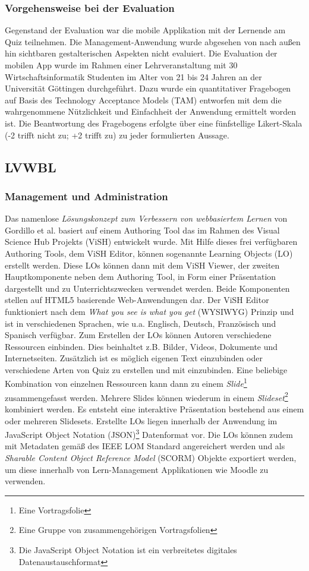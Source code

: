 \documentclass[conference]{IEEEtran}
\begin{document}
\subsubsection{Vorgehensweise bei der Evaluation}
Gegenstand der Evaluation war die mobile Applikation mit der Lernende am Quiz teilnehmen. Die Management-Anwendung wurde abgesehen von nach außen hin sichtbaren gestalterischen Aspekten nicht evaluiert. Die Evaluation der mobilen App wurde im Rahmen einer Lehrveranstaltung mit 30 Wirtschaftsinformatik Studenten im Alter von 21 bis 24 Jahren an der Universität Göttingen durchgeführt. Dazu wurde ein quantitativer Fragebogen auf Basis des Technology Acceptance Models (TAM) \cite[S. 985]{Davis1989} entworfen mit dem die wahrgenommene Nützlichkeit und Einfachheit der Anwendung ermittelt worden ist. Die Beantwortung des Fragebogens erfolgte über eine fünfstellige Likert-Skala (-2 trifft nicht zu; +2 trifft zu) zu jeder formulierten Aussage.\cite[S. 342]{Hobert2017}

\subsection{LVWBL}
\subsubsection{Management und Administration}
Das namenlose \emph{Lösungskonzept zum Verbessern von webbasiertem Lernen} von Gordillo et al. basiert auf einem Authoring Tool das im Rahmen des Visual Science Hub Projekts (ViSH) \cite{Barra2014} entwickelt wurde. Mit Hilfe dieses frei verfügbaren Authoring Tools, dem ViSH Editor, können sogenannte Learning Objects (LO) erstellt werden. Diese LOs können dann mit dem ViSH Viewer, der zweiten Hauptkomponente neben dem Authoring Tool, in Form einer Präsentation dargestellt und zu Unterrichtszwecken verwendet werden. Beide Komponenten stellen auf HTML5 basierende Web-Anwendungen dar. Der ViSH Editor funktioniert nach dem \emph{What you see is what you get} (WYSIWYG) Prinzip und ist in verschiedenen Sprachen, wie u.a. Englisch, Deutsch, Französisch und Spanisch verfügbar. Zum Erstellen der LOs können Autoren verschiedene Ressourcen einbinden. Dies beinhaltet z.B. Bilder, Videos, Dokumente und Internetseiten. Zusätzlich ist es möglich eigenen Text einzubinden oder verschiedene Arten von Quiz zu erstellen und mit einzubinden. Eine beliebige Kombination von einzelnen Ressourcen kann dann zu einem \emph{Slide}\footnote{Eine Vortragsfolie} zusammengefasst werden. Mehrere Slides können wiederum in einem \emph{Slideset}\footnote{Eine Gruppe von zusammengehörigen Vortragsfolien} kombiniert werden. Es entsteht eine interaktive Präsentation bestehend aus einem oder mehreren Slidesets. Erstellte LOs liegen innerhalb der Anwendung im JavaScript Object Notation (JSON)\footnote{Die JavaScript Object Notation ist ein verbreitetes digitales Datenaustauschformat} Datenformat vor. Die LOs können zudem mit Metadaten gemäß des IEEE LOM Standard angereichert werden und als \emph{Sharable Content Object Reference Model} (SCORM) Objekte exportiert werden, um diese innerhalb von Lern-Management Applikationen wie Moodle zu verwenden. \cite[S. 3]{Gordillo2015}
\end{document}
